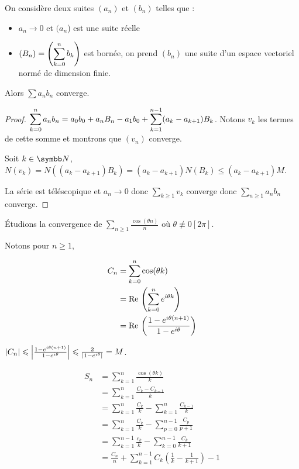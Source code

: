 \begin{theoreme}{}{}
    On considère deux suites $(a_n)$ et $(b_n)$ telles que :
    \begin{itemize}
        \item $a_n \to 0$ et $(a_n$) est une suite réelle
        \item $\displaystyle (B_n) = \left(\sum_{k=0}^n b_k\right)$ est bornée, on prend $(b_n)$ une suite d'un espace vectoriel normé de dimension finie.
    \end{itemize}

    Alors $\sum a_n b_n$ converge.
\end{theoreme}

\begin{proof}
$\displaystyle \sum_{k=0}^n a_n b_n = a_0 b_0 + a_n B_n - a_1 b_0 + \sum_{k=1}^{n-1} (a_k - a_{k+1}) B_k$. Notons $v_k$ les termes de cette somme et montrons que $(v_n)$ converge.

Soit $k \in \N$, $N(v_k) = N((a_k - a_{k+1}) B_k) = (a_k - a_{k+1}) N(B_k) \leqslant (a_{k} - a_{k+1}) M$.

La série est téléscopique et $a_n \to 0$ donc $\sum_{k\geqslant 1} v_k$ converge donc $\sum_{n \geqslant 1} a_n b_n$ converge.
\end{proof}

Étudions la convergence de $\sum_{n \geqslant 1} \frac{\cos(\theta n)}{n}$ où $\theta \not \equiv 0 [2\pi]$.

Notons pour $n \geqslant 1, $

\begin{align*}
    C_n & = \sum_{k = 0}^{n} \cos(\theta k) \\
        & = \operatorname{Re} \, \left( \sum_{k = 0}^{n} e^{i \theta k} \right) \\
        & = \operatorname{Re} \, \left( \frac{1 - e^{i \theta (n + 1)}}{1 - e^{i \theta}} \right) 
\end{align*}

$\left|C_n\right| \leqslant \left|\frac{1 - e^{i \theta (n + 1)}}{1 - e^{i \theta}}\right| \leqslant \frac{2}{\left|1 - e^{i \theta}\right|} = M$.

{\allowdisplaybreaks
\begin{align*}
    S_n & = \sum_{k = 1}^{n} \frac{\cos(\theta k)}{k} \\
        & = \sum_{k = 1}^{n} \frac{C_k - C_{k - 1}}{k} \\
        & = \sum_{k = 1}^{n} \frac {C_k} k - \sum_{k = 1}^{n} \frac{C_{k - 1}}{k} \\
        & = \sum_{k = 1}^{n} \frac{C_k}{k} - \sum_{p = 0}^{n - 1} \frac{C_p}{p + 1} \\
        & = \sum_{k = 1}^{n - 1} \frac{c_k}{k} - \sum_{k = 0 }^{n - 1 } \frac{C_k}{k + 1} \\
        & = \frac{C_n} n + \sum_{k = 1}^{n - 1} C_k \left( \frac 1 k - \frac 1 {k + 1} \right) - 1 
\end{align*}
}

